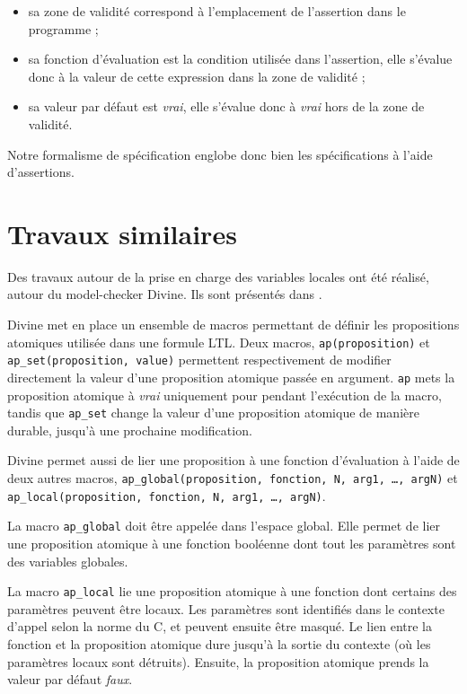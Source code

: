 \begin{itemize}
\item
  sa zone de validité correspond à l'emplacement de l'assertion dans le
  programme ;
\item
  sa fonction d'évaluation est la condition utilisée dans l'assertion,
  elle s'évalue donc à la valeur de cette expression dans la zone de
  validité ;
\item
  sa valeur par défaut est \emph{vrai}, elle s'évalue donc à \emph{vrai}
  hors de la zone de validité.
\end{itemize}

Notre formalisme de spécification englobe donc bien les spécifications à l'aide
d'assertions.

\section{Travaux similaires}\label{sec:related_work}

Des travaux autour de la prise en charge des variables locales ont été réalisé,
autour du model-checker Divine\cite{Divine_3_0}. Ils sont présentés dans
\cite{Divine_LTL}.

Divine met en place un ensemble de macros permettant de définir les propositions
atomiques utilisée dans une formule LTL. Deux macros, \texttt{ap(proposition)}
et \texttt{ap\_set(proposition, value)} permettent respectivement de modifier
directement la valeur d'une proposition atomique passée en argument. \texttt{ap}
mets la proposition atomique à \emph{vrai} uniquement pour pendant l'exécution
de la macro, tandis que \texttt{ap\_set} change la valeur d'une proposition
atomique de manière durable, jusqu'à une prochaine modification.

Divine permet aussi de lier une proposition à une fonction d'évaluation à l'aide
de deux autres macros, \texttt{ap\_global(proposition, fonction, N, arg1, \dots,
  argN)} et \texttt{ap\_local(proposition, fonction, N, arg1, \dots, argN)}.

La macro \texttt{ap\_global} doit être appelée dans l'espace global. Elle permet
de lier une proposition atomique à une fonction booléenne dont tout les
paramètres sont des variables globales.

La macro \texttt{ap\_local} lie une proposition atomique à une fonction dont
certains des paramètres peuvent être locaux. Les paramètres sont identifiés
dans le contexte d'appel selon la norme du C, et peuvent ensuite être masqué.
Le lien entre la fonction et la proposition atomique dure jusqu'à la sortie du
contexte (où les paramètres locaux sont détruits). Ensuite, la proposition
atomique prends la valeur par défaut \emph{faux}.

